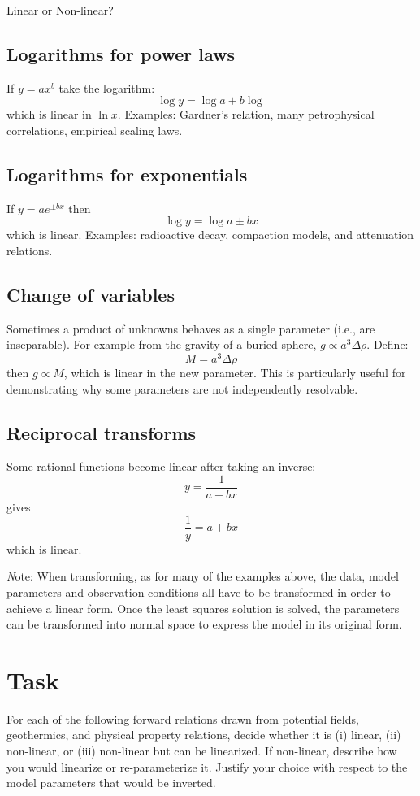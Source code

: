 \begin{activity}{Linear or Non-linear?}
\subsection*{Logarithms for power laws}
If $y=ax^b$ take the logarithm:
\[
  \log y = \log a + b \log
\]
which is linear in $\ln x$.  Examples: Gardner's relation, many petrophysical correlations,
empirical scaling laws.

\subsection*{Logarithms for exponentials}
If $y=ae^{\pm bx}$ then
\[
  \log y = \log a \pm bx
\]
which is linear.  Examples: radioactive decay, compaction models, and attenuation relations.

\subsection*{Change of variables}
Sometimes a product of unknowns behaves as a single parameter (i.e., are inseparable).  For example from the gravity of a buried sphere, $g \propto a^3\Delta\rho$.  Define:
\[
  M=a^3\Delta\rho
\]
then $g \propto M$, which is linear in the new parameter.  This is particularly useful for demonstrating why some parameters are not independently resolvable.

\subsection*{Reciprocal transforms}
Some rational functions become linear after taking an inverse:
\[
  y=\frac{1}{a+bx}
\]
gives
\[
  \frac{1}{y}=a+bx
\]
which is linear.

{\emph Note: When transforming, as for many of the examples above, the data, model parameters and observation conditions all have to be transformed in order to achieve a linear form.  Once the least squares solution is solved, the parameters can be transformed into normal space to express the model in its original form.}

\section*{Task}

For each of the following forward relations drawn from potential fields, geothermics, and physical property relations, decide whether it is (i) linear, (ii) non-linear, or (iii) non-linear but can be linearized. If non-linear, describe how you would linearize or re-parameterize it. Justify your choice with respect to the model parameters that would be inverted.


\end{activity}
